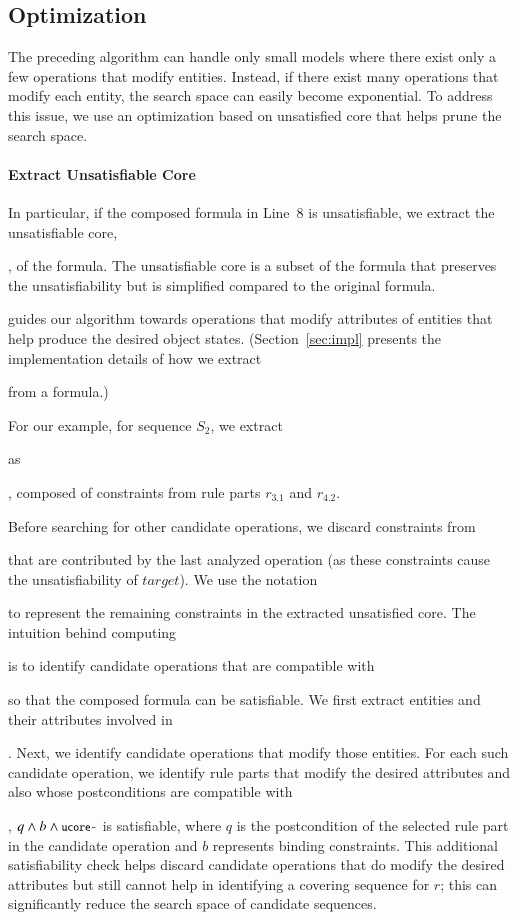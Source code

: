 \subsection{Optimization}
\label{sec:optimization}

The preceding algorithm can handle only small models where there exist only
a few operations that modify entities. Instead, if there exist many operations 
that modify each entity, the search space can easily become exponential. To
address this issue, we use an optimization based on unsatisfied core 
that helps prune the search space.

\paragraph*{Extract Unsatisfiable Core} In particular, if the composed formula in
Line~8 is unsatisfiable, we extract the unsatisfiable core, \subject{ucore},
of the formula. The unsatisfiable core is a subset of the formula that preserves
the unsatisfiability but is simplified compared to the original formula.
\subject{ucore} guides our algorithm towards operations that modify
attributes of entities that help produce the desired object
states. (Section~\ref{sec:impl} presents the implementation details of how we
extract \subject{ucore} from a formula.)

For our example, for sequence $S_2$, we extract \subject{ucore} as \subject{ord.total =
  0 $\wedge$ ord.total > 0}, composed of constraints from rule parts $r_{3.1}$
and $r_{4.2}$.

Before searching for other candidate operations, we discard
constraints from \subject{ucore} that are contributed by the last analyzed
operation (as these constraints cause the unsatisfiability of $target$).  We use
the notation \subject{ucore-} to represent the remaining constraints in the
extracted unsatisfied core. The intuition behind computing \subject{ucore-} is
to identify candidate operations that are compatible with \subject{ucore-} so
that the composed formula can be satisfiable. We first extract
entities and their attributes involved in \subject{ucore-}. Next, we identify
candidate operations that modify those entities.  For each such candidate
operation, we identify rule parts that modify the desired attributes and also
whose postconditions are compatible with \subject{ucore-}, \ie{} $q \wedge b
\wedge \subject{ucore-}$ is satisfiable, where $q$ is the postcondition of the
selected rule part in the candidate operation and $b$ represents binding
constraints.  This additional satisfiability check helps discard candidate
operations that do modify the desired attributes but still cannot help in
identifying a covering sequence for $r$; this can significantly reduce the
search space of candidate sequences.

